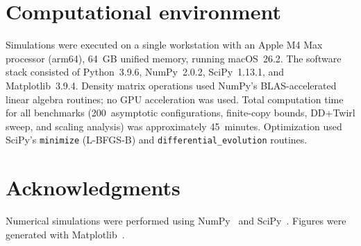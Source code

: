\documentclass[pra,twocolumn,superscriptaddress,longbibliography,floatfix]{revtex4-2}
\begin{document}
\section*{Computational environment}

Simulations were executed on a single workstation with an Apple M4 Max processor (arm64), 64~GB unified memory, running macOS~26.2.
The software stack consisted of Python~3.9.6, NumPy~2.0.2, SciPy~1.13.1, and Matplotlib~3.9.4.
Density matrix operations used NumPy's BLAS-accelerated linear algebra routines; no GPU acceleration was used.
Total computation time for all benchmarks (200~asymptotic configurations, finite-copy bounds, DD+Twirl sweep, and scaling analysis) was approximately 45~minutes.
Optimization used SciPy's \texttt{minimize} (L-BFGS-B) and \texttt{differential\allowbreak\_evolution} routines.


\section*{Acknowledgments}

Numerical simulations were performed using NumPy~\cite{numpy2020} and SciPy~\cite{scipy2020}.
Figures were generated with Matplotlib~\cite{Hunter2007}.



\end{document}
